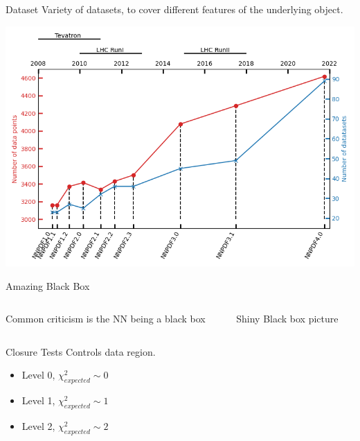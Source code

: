 \documentclass[9pt]{beamer}
\begin{document}
\begin{frame}{Dataset}
    Variety of datasets, to cover different features of the underlying object.
    
    \begin{center}
        \begin{tcolorbox}[width=0.7\textwidth]
            \includegraphics[width=\textwidth]{data}
        \end{tcolorbox}
    \end{center}
\end{frame}

\begin{frame}{Amazing Black Box}
    \begin{columns}
        \begin{column}{0.5\textwidth}
            Common criticism is the NN being a black box
        \end{column}
        \begin{column}{0.5\textwidth}
            Shiny Black box picture
        \end{column}
    \end{columns}
\end{frame}

\begin{frame}{Closure Tests}
    Controls data region.

    \begin{itemize}
        \item Level 0, $\chi^2_{expected} \sim 0$
        \item Level 1, $\chi^2_{expected} \sim 1$
        \item Level 2, $\chi^2_{expected} \sim 2$
    \end{itemize}
\end{frame}
\end{document}
